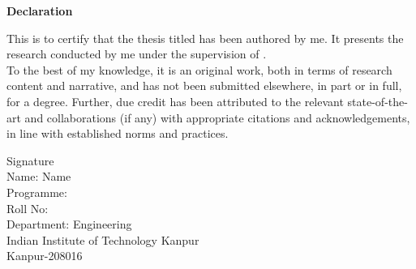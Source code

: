 \newpage
\thispagestyle{empty}
\begin{center}
    {\large \bf Declaration}
\end{center}

\vspace{0.5cm}
\noindent
This is to certify that the thesis titled   has been authored by me. It presents the research conducted by me under the supervision of . \\
To the best of my knowledge, it is an original work, both in terms of research content and narrative, and has not been submitted elsewhere, in part or in full, for a degree. Further, due credit has been attributed to the relevant state-of-the-art and collaborations (if any) with appropriate citations and acknowledgements, in line with established norms and practices.

\vspace{2.5cm}
\hspace*{7.5cm}Signature \\
\hspace*{8cm}Name: Name\\
\hspace*{8cm}Programme: \\
\hspace*{8cm}Roll No: \\
\hspace*{8cm}Department: Engineering\\
\hspace*{8cm}Indian Institute of Technology Kanpur\\
\hspace*{8cm}Kanpur-208016


